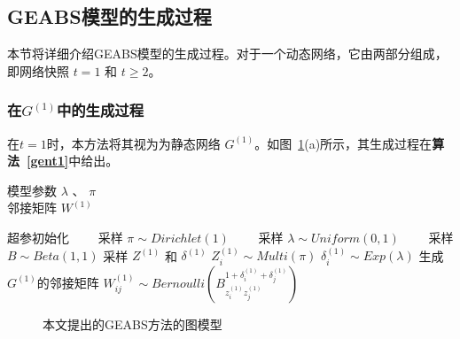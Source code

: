 \subsection{GEABS模型的生成过程}

本节将详细介绍GEABS模型的生成过程。对于一个动态网络，它由两部分组成，即网络快照 $t=1$ 和 $t \ge 2$。

\subsubsection{在$G^{(1)}$中的生成过程}
在$t=1$时，本方法将其视为为静态网络 $G^{(1)}$。如图~\ref{fig:graphmodel}(a)所示，其生成过程在\textbf{算法~\ref{gent1}}中给出。

\begin{algorithm}[H]
\caption{$t=1$}\label {gent1}
\algorithmicrequire \; 模型参数 $\lambda$ 、 $\pi$ \\
\algorithmicensure \; 邻接矩阵 $W^{(1)}$
\begin{algorithmic}[1]
\STATE 超参初始化
\STATE ~~~~采样 $\pi \sim Dirichlet (1)$ 
\STATE ~~~~采样 $\lambda \sim Uniform(0,1)$
\STATE ~~~~采样 $B \sim Beta(1,1)$
\STATE 采样 $Z^{(1)}$ 和 $\delta^{(1)}$
\STATE $Z_i^{(1)} \sim Multi(\pi)$
\STATE $\delta^{(1)}_i \sim Exp(\lambda)$
\ENDFOR
\STATE 生成$G^{(1)}$的邻接矩阵
\STATE $W^{(1)}_{ij} \sim Bernoulli(B_{z_i^{(1)} z_j^{(1)}}^{1+\delta_i^{(1)} + \delta_j^{(1)}})$
\ENDFOR
\end{algorithmic}
\end{algorithm}

\begin{figure}[htbp]
    \centering
    \vspace{-0.1in}
    \caption{本文提出的GEABS方法的图模型}
    \label{fig:graphmodel}
\end{figure}


